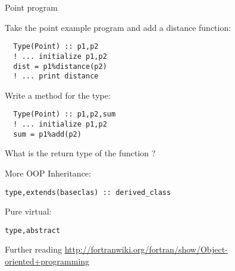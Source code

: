 \begin{block}{Point program}
  \label{sl:fpoint-program}
  \footnotesize
  
  \begin{multicols}{2}
    \columnbreak
  \end{multicols}  
\end{block}

\begin{exercise}
  \label{ex:fclass-point-distance}
  Take the point example program and add a distance function:
\begin{lstlisting}
  Type(Point) :: p1,p2
  ! ... initialize p1,p2
  dist = p1%distance(p2)
  ! ... print distance
\end{lstlisting}
\end{exercise}

\begin{exercise}
  \label{ex:fclass-translate}
  Write a method  for the  type:
\begin{lstlisting}
  Type(Point) :: p1,p2,sum
  ! ... initialize p1,p2
  sum = p1%add(p2)
\end{lstlisting}
  What is the return type of the function ?
\end{exercise}

\begin{block}{More OOP}
  \label{sl:oopf}
Inheritance:
\begin{lstlisting}
type,extends(baseclas) :: derived_class
\end{lstlisting}
Pure virtual:
\begin{lstlisting}
type,abstract
\end{lstlisting}
\end{block}

\begin{block}{Further reading}
  \url{http://fortranwiki.org/fortran/show/Object-oriented+programming}
\end{block}

\endinput

\begin{block}{Use modules!}
  \label{sl:fclass-module}
   It is of course best to put the type definition and method
   definitions in a module, so that you can \indextermfort{use} it.

   Mark methods as \indextermfort{private} so that they can only be used as part
   of the \indextermfort{type}:

   \verbatimsnippet{classmodule}
\end{block}


